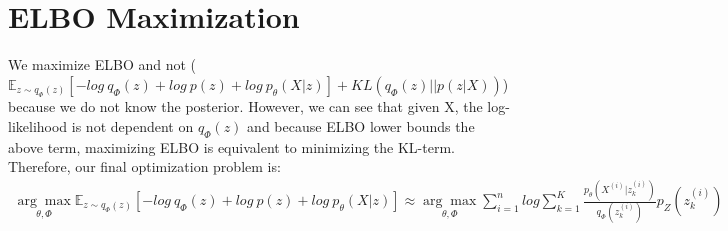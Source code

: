 \section*{ELBO Maximization}
We maximize ELBO and not ($\mathbb{E}_{z \sim q_{\Phi}(z)}[-log \ q_{\Phi}(z) + log \ p(z) + log \ p_{\theta}(X|z)]+KL(q_{\Phi}(z)||p(z|X))$) because we do not know the posterior. However, we can see that given X, the log-likelihood is not dependent on $q_{\Phi}(z)$ and because ELBO lower bounds the above term, maximizing ELBO is equivalent to minimizing the KL-term.\\
Therefore, our final optimization problem is: 
\begin{gather*}
\underset{\theta, \Phi}{\arg\max} \mathbb{E}_{z \sim q_{\Phi}(z)}[-log \ q_{\Phi}(z) + log \ p(z) + log \ p_{\theta}(X|z)] \approx \underset{\theta, \Phi}{\arg\max} \sum_{i=1}^{n}log \sum_{k=1}^{K}\frac{p_{\theta}(X^{(i)}|z_{k}^{(i)})}{q_{\Phi}(z_{k}^{(i)})}p_{Z}(z_{k}^{(i)})\\
\end{gather*}
